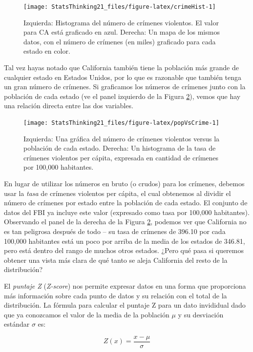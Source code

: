 \documentclass[
  12pt,
]{book}
\begin{document}
\begin{figure}
\texttt{[image: StatsThinking21\_files/figure-latex/crimeHist-1]} \caption{Izquierda: Histograma del número de crímenes violentos. El valor para CA está graficado en azul. Derecha: Un mapa de los mismos datos, con el número de crímenes (en miles) graficado para cada estado en color.}\label{fig:crimeHist}
\end{figure}

Tal vez hayas notado que California también tiene la población más grande de cualquier estado en Estados Unidos, por lo que es razonable que también tenga un gran número de crímenes. Si graficamos los números de crímenes junto con la población de cada estado (ve el panel izquierdo de la Figura \ref{fig:popVsCrime}), vemos que hay una relación directa entre las dos variables.

\begin{figure}
\texttt{[image: StatsThinking21\_files/figure-latex/popVsCrime-1]} \caption{Izquierda: Una gráfica del número de crímenes violentos versus la población de cada estado. Derecha: Un histograma de la tasa de crímenes violentos per cápita, expresada en cantidad de crímenes por 100,000 habitantes.}\label{fig:popVsCrime}
\end{figure}

En lugar de utilizar los números en bruto (o crudos) para los crímenes, debemos usar la \emph{tasa} de crímenes violentos per cápita, el cual obtenemos al dividir el número de crímenes por estado entre la población de cada estado. El conjunto de datos del FBI ya incluye este valor (expresado como tasa por 100,000 habitantes). Observando el panel de la derecha de la Figura \ref{fig:popVsCrime}, podemos ver que California no es tan peligrosa después de todo -- su tasa de crímenes de 396.10 por cada 100,000 habitantes está un poco por arriba de la media de los estados de 346.81, pero está dentro del rango de muchos otros estados. ¿Pero qué pasa si queremos obtener una vista más clara de qué tanto se aleja California del resto de la distribución?

El \emph{puntaje Z} (\emph{Z-score}) nos permite expresar datos en una forma que proporciona más información sobre cada punto de datos y su relación con el total de la distribución. La fórmula para calcular el puntaje Z para un dato invididual dado que ya conozcamos el valor de la media de la población \(\mu\) y su desviación estándar \(\sigma\) es:

\[
Z(x) = \frac{x - \mu}{\sigma}
\]
\end{document}
